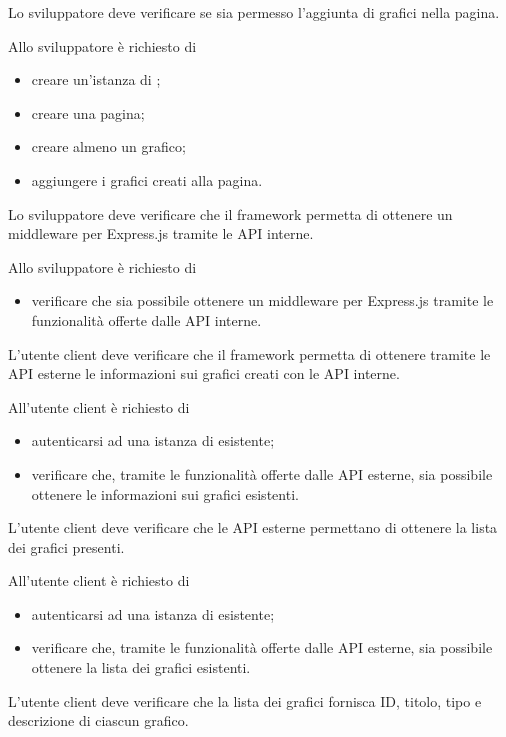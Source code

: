 	Lo sviluppatore deve verificare se sia permesso l'aggiunta di grafici nella pagina.
		
		Allo sviluppatore è richiesto di
		\begin{itemize}
			\item creare un'istanza di \projectname{};
			\item creare una pagina;
			\item creare almeno un grafico;
			\item aggiungere i grafici creati alla pagina.
		\end{itemize}

	Lo sviluppatore deve verificare che il framework permetta di ottenere un middleware per Express.js tramite le API interne.
		
		Allo sviluppatore è richiesto di
		\begin{itemize}
			\item verificare che sia possibile ottenere un middleware per Express.js tramite le funzionalità offerte dalle API interne.
		\end{itemize}

	L'utente client deve verificare che il framework permetta di ottenere tramite le API esterne le informazioni sui grafici creati con le API interne.

		All'utente client è richiesto di
		\begin{itemize}
			\item autenticarsi ad una istanza di \projectname{} esistente;
			\item verificare che, tramite le funzionalità offerte dalle API esterne, sia possibile ottenere le informazioni sui grafici esistenti.
		\end{itemize}

	L'utente client deve verificare che le API esterne permettano di ottenere la lista dei grafici presenti.

		All'utente client è richiesto di
		\begin{itemize}
			\item autenticarsi ad una istanza di \projectname{} esistente;
			\item verificare che, tramite le funzionalità offerte dalle API esterne, sia possibile ottenere la lista dei grafici esistenti.
		\end{itemize}

	L'utente client deve verificare che la lista dei grafici fornisca ID, titolo, tipo e descrizione di ciascun grafico.
		
